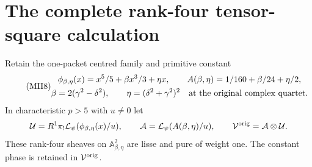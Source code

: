 \documentclass[11pt]{article}
\renewcommand{\AA}{\mathbb A}
\begin{document}
\section{The complete rank-four tensor-square calculation}
Retain the one-packet centred family and primitive constant
\begin{equation}\tag{MII8}\label{mii:quintic}
 \begin{gathered}
 \phi_{\beta,\eta}(x)=x^5/5+\beta x^3/3+\eta x,\qquad
 A(\beta,\eta)=1/160+\beta/24+\eta/2,\\
 \beta=2(\gamma^2-\delta^2),\qquad
 \eta=(\delta^2+\gamma^2)^2
 \quad\hbox{at the original complex quartet}.
 \end{gathered}
\end{equation}
In characteristic $p>5$ with $u\ne0$ let
\[
 \mathcal U=R^1\pi_!\mathcal L_\psi(\phi_{\beta,\eta}(x)/u),\qquad
 \mathcal A=\mathcal L_\psi(A(\beta,\eta)/u),\qquad
 \mathcal V^{\rm orig}=\mathcal A\otimes\mathcal U.
\]
These rank-four sheaves on $\AA^2_{\beta,\eta}$ are lisse and pure of
weight one. The constant phase is retained in $\mathcal V^{\rm orig}$.
\end{document}
